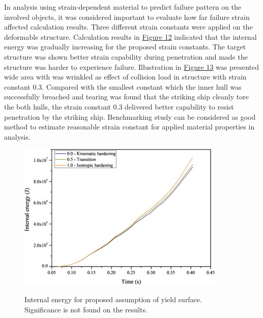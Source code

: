 \documentclass[../Final.tex]{subfiles}
\begin{document}
In analysis using strain-dependent material to predict failure pattern on the involved objects, it was considered important to evaluate how far failure strain affected calculation results. 
Three different strain constants were applied on the deformable structure. 
Calculation results in \hyperref[fig12]{Figure 12} indicated that the internal energy was gradually increasing for the proposed strain constants. 
The target structure was shown better strain capability during penetration and made the structure was harder to experience failure. Illustration in \hyperref[fig13]{Figure 13} was presented wide area with was wrinkled as effect 
of collision load in structure with strain constant 0.3. Compared with the smallest constant which the inner hull was successfully breached and tearing was found that the striking ship cleanly tore the both hulls, 
the strain constant 0.3 delivered better capability to resist penetration by the striking ship. 
Benchmarking study can be considered as good method to estimate reasonable strain constant for applied material properties in analysis. 

\begin{figure}[ht]
    \centering
    \includegraphics[width=\columnwidth]{fig14.jpg}
    \label{fig14}
    \caption{Internal energy for proposed assumption of yield surface. Significance is not found on the results.}
\end{figure}
\end{document}

